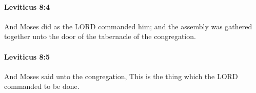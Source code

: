 		\paragraph{Leviticus 8:4} %
			\label{LEVITICUS-8-4}

			And Moses did as the LORD commanded him; and the assembly was gathered together unto the door of the tabernacle of the congregation.


		\paragraph{Leviticus 8:5} %
			\label{LEVITICUS-8-5}

			And Moses said unto the congregation, This is the thing which the LORD commanded to be done.


